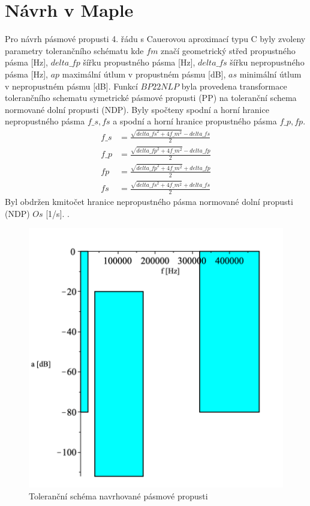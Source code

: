 \documentclass[twoside]{article}
\begin{document}
\section{Návrh v Maple}
Pro návrh pásmové propusti 4. řádu s Cauerovou aproximací typu C byly zvoleny parametry tolerančního schématu 
\noindent kde $fm$ značí geometrický střed propustného pásma [Hz], $delta\_{fp}$ šířku propustného pásma [Hz],
$delta\_{fs} $ šířku nepropustného pásma [Hz], $ap$ maximální útlum v propustném pásmu [dB], $as$ minimální útlum v nepropustném pásmu [dB].
Funkcí $BP22NLP$ byla provedena transformace tolerančního schematu symetrické pásmové propusti (PP) na toleranční schema normované dolní propusti (NDP). Byly spočteny spodní a horní hranice nepropustného pásma $f\_s,fs$ a spodní a horní hranice propustného pásma $f\_p,fp$. 
\begin{align}
f\_s &= \frac{\sqrt{delta\_{fs}^2+4f\_m ^2}-delta\_{fs}}{2}\\
f\_p &= \frac{\sqrt{delta\_{fp}^2+4f\_m ^2}-delta\_{fp}}{2}\\
fp &= \frac{\sqrt{delta\_{fp}^2+4f\_m ^2}+delta\_{fp}}{2}\\
fs &= \frac{\sqrt{delta\_{fs}^2+4f\_m ^2}+delta\_{fs}}{2}
\end{align}
\noindent Byl obdržen kmitočet hranice nepropustného pásma normované dolní propusti (NDP) $Os$ [1/s].
.
\begin{figure}[H]
\centering
\includegraphics[scale=0.5]{tolsch.png}
\caption{Toleranční schéma navrhované pásmové propusti}
\end{figure}
\end{document}
